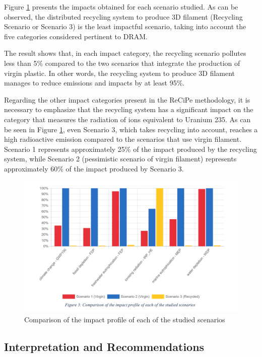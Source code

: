 \documentclass[12pt]{elsarticle} %
\begin{document}
Figure \ref{fig:figure3} presents the impacts obtained for each scenario studied. As can be observed, the distributed recycling system to produce 3D filament (Recycling Scenario or Scenario 3) is the least impactful scenario, taking into account the five categories considered pertinent to DRAM.

The result shows that, in each impact category, the recycling scenario pollutes less than 5\% compared to the two scenarios that integrate the production of virgin plastic.
In other words, the recycling system to produce 3D filament manages to reduce emissions and impacts by at least 95\%.

Regarding the other impact categories present in the ReCiPe methodology, it is necessary to emphasize that the recycling system has a significant impact on the category that measures the radiation of ions equivalent to Uranium 235.
As can be seen in Figure \ref{fig:figure3}, even Scenario 3, which takes recycling into account, reaches a high radioactive emission compared to the scenarios that use virgin filament.
Scenario 1 represents approximately 25\% of the impact produced by the recycling system, while Scenario 2 (pessimistic scenario of virgin filament) represents approximately 60\% of the impact produced by Scenario 3.

\begin{figure}[H]

{\centering \includegraphics[width=0.8\linewidth,]{Figures/Figure-3} 

}

\caption{Comparison of the impact profile of each of the studied scenarios}\label{fig:figure3}
\end{figure}

\hypertarget{interpretation-and-recommendations}{%
\subsection{Interpretation and Recommendations}\label{interpretation-and-recommendations}}
\end{document}
